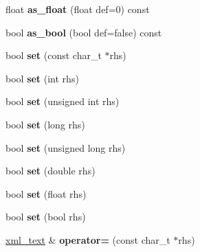 \begin{DoxyCompactItemize}
\item 
\mbox{\label{classpugi_1_1xml__text_a290c785ba640e2476486be9e0d35d379}} 
float {\bfseries as\+\_\+float} (float def=0) const
\item 
\mbox{\label{classpugi_1_1xml__text_a583ed6823051f189df16fe74d25b7042}} 
bool {\bfseries as\+\_\+bool} (bool def=false) const
\item 
\mbox{\label{classpugi_1_1xml__text_ab31930ff4f5ad568549f85dbb697e60e}} 
bool {\bfseries set} (const char\+\_\+t $\ast$rhs)
\item 
\mbox{\label{classpugi_1_1xml__text_a66ebe5bd62e843197305ed68661b0a26}} 
bool {\bfseries set} (int rhs)
\item 
\mbox{\label{classpugi_1_1xml__text_a9d780e113aa0b1f4bbf2d0a88fe2c42f}} 
bool {\bfseries set} (unsigned int rhs)
\item 
\mbox{\label{classpugi_1_1xml__text_a998d885909d8bb43c40f03cd27e1c809}} 
bool {\bfseries set} (long rhs)
\item 
\mbox{\label{classpugi_1_1xml__text_a19d022a9aa6734d10f05a47862234e90}} 
bool {\bfseries set} (unsigned long rhs)
\item 
\mbox{\label{classpugi_1_1xml__text_acf32e49c31a07f7bad1f9bdfb71bdc1e}} 
bool {\bfseries set} (double rhs)
\item 
\mbox{\label{classpugi_1_1xml__text_a5de352282b5673bf5c98d22831f946a7}} 
bool {\bfseries set} (float rhs)
\item 
\mbox{\label{classpugi_1_1xml__text_a0d75ccc7ede3b3d590352267a0f0fcb9}} 
bool {\bfseries set} (bool rhs)
\item 
\mbox{\label{classpugi_1_1xml__text_a0b895996d14f50afca11b9a82276038d}} 
\hyperlink{classpugi_1_1xml__text}{xml\+\_\+text} \& {\bfseries operator=} (const char\+\_\+t $\ast$rhs)
\item 

\end{DoxyCompactItemize}
